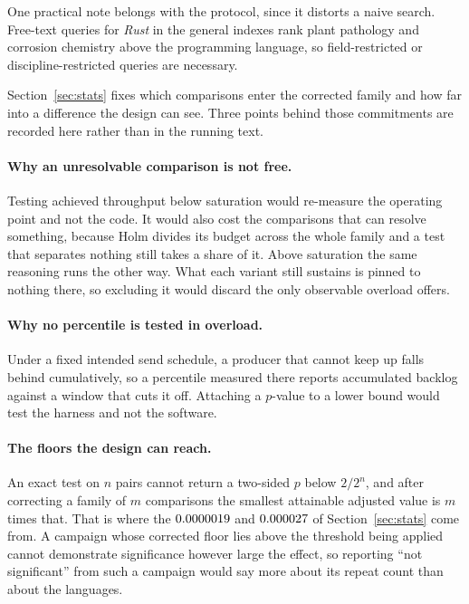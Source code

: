 \documentclass[english,oneside,a4paper,censored,csm,software-track-2020]{HYthesisML}
\begin{document}
\begin{appendices}
One practical note belongs with the protocol, since it distorts a naive search. Free-text queries
for \emph{Rust} in the general indexes rank plant pathology and corrosion chemistry above the
programming language, so field-restricted or discipline-restricted queries are necessary.

Section~\ref{sec:stats} fixes which comparisons enter the corrected family and how far into a
difference the design can see. Three points behind those commitments are recorded here rather
than in the running text.

\paragraph{Why an unresolvable comparison is not free.}
Testing achieved throughput below saturation would re-measure the operating point and not the
code. It would also cost the comparisons that can resolve something, because Holm divides its
budget across the whole family and a test that separates nothing still takes a share of it. Above
saturation the same reasoning runs the other way. What each variant still sustains is pinned to
nothing there, so excluding it would discard the only observable overload offers.

\paragraph{Why no percentile is tested in overload.}
Under a fixed intended send schedule, a producer that cannot keep up falls behind cumulatively, so
a percentile measured there reports accumulated backlog against a window that cuts it off.
Attaching a $p$-value to a lower bound would test the harness and not the software.

\paragraph{The floors the design can reach.}
An exact test on $n$ pairs cannot return a two-sided $p$ below $2/2^{n}$, and after correcting a
family of $m$ comparisons the smallest attainable adjusted value is $m$ times that. That is where
the $0.0000019$ and $0.000027$ of Section~\ref{sec:stats} come from. A campaign whose
corrected floor lies above the threshold being applied cannot demonstrate significance however
large the effect, so reporting ``not significant'' from such a campaign would say more about its
repeat count than about the languages.


\end{appendices}
\end{document}
